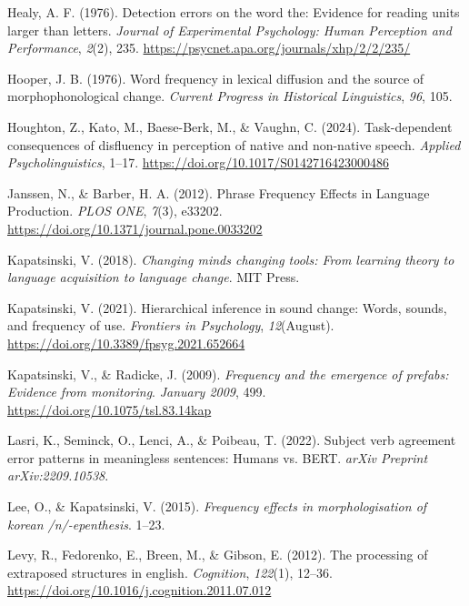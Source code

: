 \documentclass[
  12pt,
  letterpaper,
]{scrreprt}
\newlength{\cslhangindent}
\newenvironment{CSLReferences}[2] %
 {\begin{list}{}{%
  \setlength{\itemindent}{0pt}
  \setlength{\leftmargin}{0pt}
  \setlength{\parsep}{0pt}
  \ifodd #1
   \setlength{\leftmargin}{\cslhangindent}
   \setlength{\itemindent}{-1\cslhangindent}
  \fi
  \setlength{\itemsep}{#2\baselineskip}}}
 {\end{list}}
\begin{document}
\begin{CSLReferences}{1}{0}
Healy, A. F. (1976). Detection errors on the word the: Evidence for
reading units larger than letters. \emph{Journal of Experimental
Psychology: Human Perception and Performance}, \emph{2}(2), 235.
\url{https://psycnet.apa.org/journals/xhp/2/2/235/}

Hooper, J. B. (1976). Word frequency in lexical diffusion and the source
of morphophonological change. \emph{Current Progress in Historical
Linguistics}, \emph{96}, 105.

Houghton, Z., Kato, M., Baese-Berk, M., \& Vaughn, C. (2024).
Task-dependent consequences of disfluency in perception of native and
non-native speech. \emph{Applied Psycholinguistics}, 1--17.
\url{https://doi.org/10.1017/S0142716423000486}

Janssen, N., \& Barber, H. A. (2012). Phrase Frequency Effects in
Language Production. \emph{PLOS ONE}, \emph{7}(3), e33202.
\url{https://doi.org/10.1371/journal.pone.0033202}

Kapatsinski, V. (2018). \emph{Changing minds changing tools: From
learning theory to language acquisition to language change}. MIT Press.

Kapatsinski, V. (2021). Hierarchical inference in sound change: Words,
sounds, and frequency of use. \emph{Frontiers in Psychology},
\emph{12}(August). \url{https://doi.org/10.3389/fpsyg.2021.652664}

Kapatsinski, V., \& Radicke, J. (2009). \emph{Frequency and the
emergence of prefabs: Evidence from monitoring}. \emph{January 2009},
499. \url{https://doi.org/10.1075/tsl.83.14kap}

Lasri, K., Seminck, O., Lenci, A., \& Poibeau, T. (2022). Subject verb
agreement error patterns in meaningless sentences: Humans vs. BERT.
\emph{arXiv Preprint arXiv:2209.10538}.

Lee, O., \& Kapatsinski, V. (2015). \emph{Frequency effects in
morphologisation of korean /n/-epenthesis}. 1--23.

Levy, R., Fedorenko, E., Breen, M., \& Gibson, E. (2012). The processing
of extraposed structures in english. \emph{Cognition}, \emph{122}(1),
12--36. \url{https://doi.org/10.1016/j.cognition.2011.07.012}


\end{CSLReferences}
\end{document}
